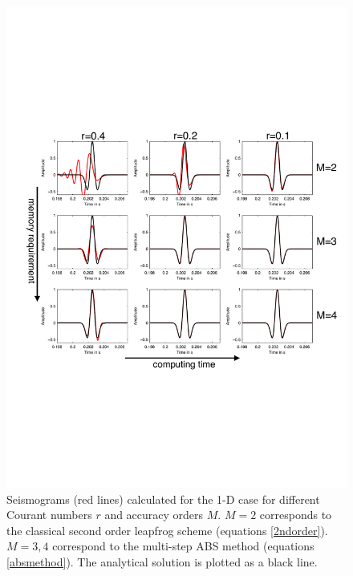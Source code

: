 \documentclass[11pt,onecolumn,oneside]{article}
\begin{document}
\begin{figure}[!h]
\begin{center}
\includegraphics[width=\textwidth]{eps/seismo.pdf}
\caption{Seismograms (red lines) calculated for the 1-D case for different Courant numbers $r$ and accuracy orders $M$. $M=2$ corresponds to the classical second order leapfrog scheme (equations \ref{2ndorder}). $M=3,4$ correspond to the multi-step ABS method (equations \ref{absmethod}). The analytical solution is plotted as a black line. }
\label{fig_1dfdseis}
\end{center}
\end{figure}
\end{document}
